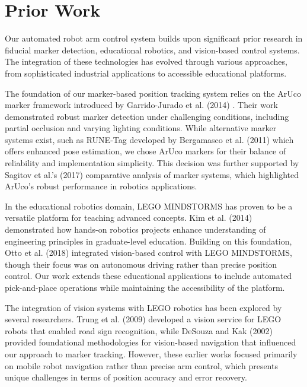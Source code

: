\documentclass[10pt,twocolumn]{article}
\begin{document}
\section{Prior Work}
\label{sec:paper}

Our automated robot arm control system builds upon significant prior research in fiducial marker detection, educational robotics, and vision-based control systems. The integration of these technologies has evolved through various approaches, from sophisticated industrial applications to accessible educational platforms.

The foundation of our marker-based position tracking system relies on the ArUco marker framework introduced by Garrido-Jurado et al. (2014) \cite{garrido2014automatic}. Their work demonstrated robust marker detection under challenging conditions, including partial occlusion and varying lighting conditions. While alternative marker systems exist, such as RUNE-Tag developed by Bergamasco et al. (2011) \cite{bergamasco2016accurate} which offers enhanced pose estimation, we chose ArUco markers for their balance of reliability and implementation simplicity. This decision was further supported by Sagitov et al.'s (2017) \cite{sagitov2017comparing} comparative analysis of marker systems, which highlighted ArUco's robust performance in robotics applications.

In the educational robotics domain, LEGO MINDSTORMS has proven to be a versatile platform for teaching advanced concepts. Kim et al. (2014) \cite{kim2014using} demonstrated how hands-on robotics projects enhance understanding of engineering principles in graduate-level education. Building on this foundation, Otto et al. (2018) \cite{otto2018teaching} integrated vision-based control with LEGO MINDSTORMS, though their focus was on autonomous driving rather than precise position control. Our work extends these educational applications to include automated pick-and-place operations while maintaining the accessibility of the platform.

The integration of vision systems with LEGO robotics has been explored by several researchers. Trung et al. (2009) \cite{trung2009development} developed a vision service for LEGO robots that enabled road sign recognition, while DeSouza and Kak (2002) \cite{desouza2002vision} provided foundational methodologies for vision-based navigation that influenced our approach to marker tracking. However, these earlier works focused primarily on mobile robot navigation rather than precise arm control, which presents unique challenges in terms of position accuracy and error recovery.
\end{document}
